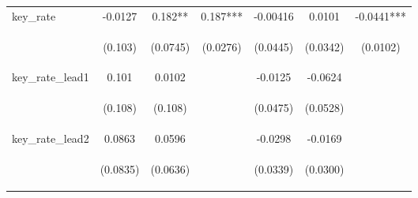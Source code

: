 \documentclass[]{article}
\begin{document}
\begin{center}
\begin{tabular}{lcccccc}
key\_rate & -0.0127 & 0.182** & 0.187*** & -0.00416 & 0.0101 & -0.0441*** \\
\vspace{4pt} & \begin{footnotesize}(0.103)\end{footnotesize} & \begin{footnotesize}(0.0745)\end{footnotesize} & \begin{footnotesize}(0.0276)\end{footnotesize} & \begin{footnotesize}(0.0445)\end{footnotesize} & \begin{footnotesize}(0.0342)\end{footnotesize} & \begin{footnotesize}(0.0102)\end{footnotesize} \\
key\_rate\_lead1 & 0.101 & 0.0102 &  & -0.0125 & -0.0624 &  \\
\vspace{4pt} & \begin{footnotesize}(0.108)\end{footnotesize} & \begin{footnotesize}(0.108)\end{footnotesize} & \begin{footnotesize}\end{footnotesize} & \begin{footnotesize}(0.0475)\end{footnotesize} & \begin{footnotesize}(0.0528)\end{footnotesize} & \begin{footnotesize}\end{footnotesize} \\
key\_rate\_lead2 & 0.0863 & 0.0596 &  & -0.0298 & -0.0169 &  \\
\vspace{4pt} & \begin{footnotesize}(0.0835)\end{footnotesize} & \begin{footnotesize}(0.0636)\end{footnotesize} & \begin{footnotesize}\end{footnotesize} & \begin{footnotesize}(0.0339)\end{footnotesize} & \begin{footnotesize}(0.0300)\end{footnotesize} & \begin{footnotesize}\end{footnotesize} \\

\end{tabular}
\end{center}
\end{document}
